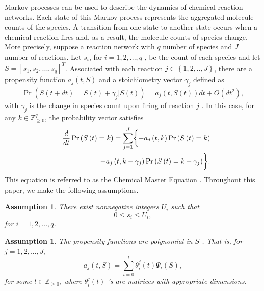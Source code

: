 \documentclass[letterpaper, 10 pt, conference]{ieeeconf}
\newtheorem{assumption}[theorem]{Assumption}
\begin{document}
Markov processes can be used to describe the dynamics of chemical reaction
networks. Each state of this Markov process represents the aggregated
molecule counts of the species. A transition from one state to another state
occurs when a chemical reaction fires and, as a result, the molecule counts
of species change. More precisely, suppose a reaction network with $q$
number of species and $J$ number of reactions. Let $s_{i}$, for $i=1,2,...,q$%
, be the count of each species and let $S=\left[ s_{1},s_{2},...,s_{q}\right]
^{T} $. Associated with each reaction $j\in \left\{ 1,2,..,J\right\} $,
there are a propensity function $a_{j}\left( t,S\right) $ and a
stoichiometry vector $\gamma _{j}$ defined as%
\begin{equation*}
\Pr \left( S\left( t+dt\right) =S\left( t\right) +\gamma _{j}|S\left(
t\right) \right) =a_{j}\left( t,S\left( t\right) \right) dt+O\left(
dt^{2}\right) ,
\end{equation*}%
with $\gamma _{j}$ is the change in species count upon firing of reaction $j$%
. In this case, for any $k\in \mathbb{Z}_{\geq 0}^{q}$, the probability
vector satisfies 
\begin{eqnarray}
&& \frac{d}{dt}\Pr \left( S\left( t\right) =k\right)=\sum_{j=1}^{J} \biggl\{ %
-a_{j}\left( t,k\right) \Pr \left( S\left( t\right)=k\right)  \notag \\
&& +a_{j}\left( t,k-\gamma _{j}\right) \Pr \left( S\left( t\right) =k-\gamma
_{j}\right)\biggr\}.  \label{eq:CME1}
\end{eqnarray}
This equation is referred to as the Chemical Master Equation \cite%
{van1983stochastic}\cite{gillespie1992rigorous}. Throughout this paper, we
make the following assumptions.

\begin{assumption}
\label{assumption:1}There exist nonnegative integers $U_{i}$ such that 
\begin{equation*}
0\leq s_{i}\leq U_{i},
\end{equation*}%
for $i=1,2,...,q$.
\end{assumption}

\begin{assumption}
\label{assumption:2}The propensity functions are polynomial in $S$ \cite%
{gillespie1976general}\cite{gillespie1992rigorous}. That is, for $%
j=1,2,...,J $,%
\begin{equation*}
a_{j}\left( t,S\right) =\sum_{i=0}^{l}\theta _{i}^{j}\left( t\right) \Psi
_{i}\left( S\right) ,
\end{equation*}%
for some $l\in \mathbb{Z}_{\geq 0}$, where $\theta _{i}^{j}\left( t\right) $%
's are matrices with appropriate dimensions.
\end{assumption}
\end{document}

